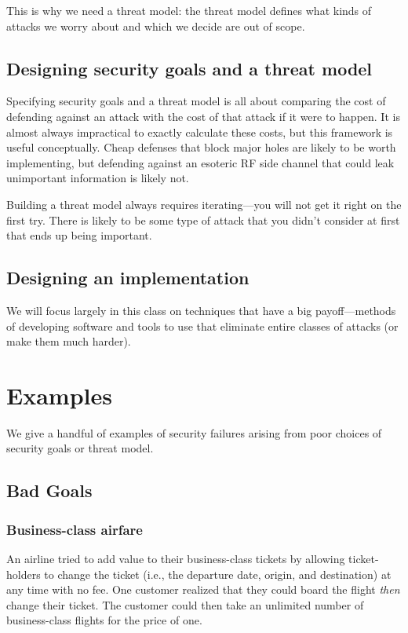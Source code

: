 This is why we need a threat model: the threat
model defines what kinds of attacks we worry about
and which we decide are out of scope.

\subsection{Designing security goals and a threat model}
Specifying security goals and
a threat model is all about comparing
the cost of defending against an attack with the
cost of that attack if it were to happen.
It is almost always impractical to exactly calculate
these costs, but this framework is useful
conceptually.
Cheap defenses that block major
holes are likely to be worth implementing, but
defending against an esoteric RF side channel that
could leak unimportant information is likely not.

Building a threat model always requires iterating---you will not get it right on the first try.
There is likely to be some type of attack that you didn't consider at first that ends up being important.

\subsection{Designing an implementation}
We will focus largely in this class on techniques
that have a big payoff---methods of developing
software and tools to use that eliminate entire
classes of attacks (or make them much harder). 

\section{Examples}

We give a handful of examples of security failures arising from poor
choices of security goals or threat model.

\subsection{Bad Goals}
\subsubsection{Business-class airfare}
An airline tried to add value to their
business-class tickets by allowing ticket-holders to 
change the ticket (i.e., the departure date, origin, and destination)
at any time with no fee.
One customer realized that they could board the flight
\textit{then} change their ticket.
The customer could then take an unlimited number of
business-class flights for the price of one.

